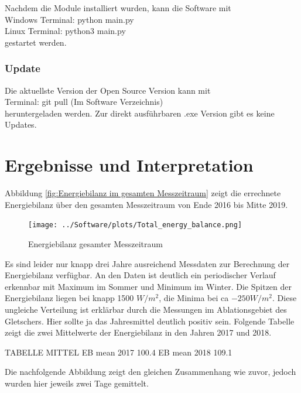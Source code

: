 \documentclass[12pt,a4paper]{article}
\begin{document}
Nachdem die Module installiert wurden, kann die Software mit \\

Windows Terminal: \textsf{\small python main.py}\\
Linux Terminal: \textsf{\small python3 main.py}\\

gestartet werden.

\subsubsection{Update}
Die aktuellste Version der Open Source Version kann mit \\

Terminal: \textsf{\small git pull} (Im Software Verzeichnis)\\

heruntergeladen werden. Zur direkt ausführbaren .exe Version gibt es keine Updates.

\pagebreak
\section{Ergebnisse und Interpretation}

Abbildung \ref{fig:Energiebilanz im gesamten Messzeitraum} zeigt die errechnete Energiebilanz über den gesamten Messzeitraum von Ende 2016 bis Mitte 2019. 

\begin{figure}[H]
\centering
\texttt{[image: ../Software/plots/Total\_energy\_balance.png]}
\caption{Energiebilanz gesamter Messzeitraum}
\label{fig:Energiebilanz gesamter Messzeitraum}
\end{figure}

Es sind leider nur knapp drei Jahre ausreichend Messdaten zur Berechnung der Energiebilanz verfügbar. An den Daten ist deutlich ein periodischer Verlauf erkennbar mit Maximum im Sommer und Minimum im Winter. Die Spitzen der Energiebilanz liegen bei knapp 1500 $W/m^2$, die Minima bei ca $-250 W/m^2$. Diese ungleiche Verteilung ist erklärbar durch die Messungen im Ablationsgebiet des Gletschers. Hier sollte ja das Jahresmittel deutlich positiv sein. Folgende Tabelle zeigt die zwei Mittelwerte der Energiebilanz in den Jahren 2017 und 2018.

TABELLE MITTEL 
EB mean 2017 100.4 %
EB mean 2018 109.1 %

Die nachfolgende Abbildung zeigt den gleichen Zusammenhang wie zuvor, jedoch wurden hier jeweils zwei Tage gemittelt.
\end{document}
